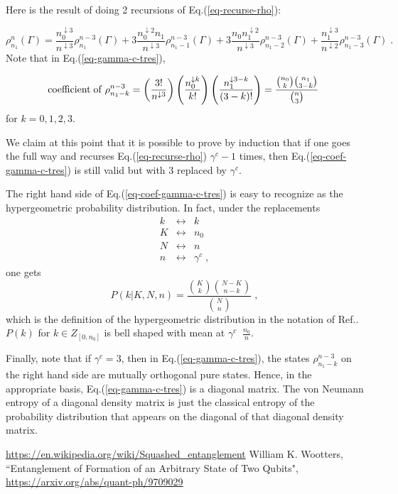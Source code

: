 \documentclass[12pt]{article}%
\newcommand{\beq}{\begin{equation}}
\newcommand{\eeq}{\end{equation}}
\newcommand{\beqa}{\begin{eqnarray}}
\newcommand{\eeqa}{\end{eqnarray}}
\newcommand{\darrow}[0]{{\downarrow}}
\begin{document}
{Here is the result of doing 2 recursions
of Eq.(\ref{eq-recurse-rho}):

\beq
\rho^{n}_{n_1}(\Gamma)=
\frac{n_0^{\darrow 3}}{n^{\darrow 3}}
\rho^{n-3}_{n_1}(\Gamma)
+
3\frac{n_0^{\darrow 2}n_1}{n^{\darrow 3}}
\rho^{n-3}_{n_1-1}(\Gamma)
+
3\frac{n_0 n_1^{\darrow 2}}{n^{\darrow 3}}
\rho^{n-3}_{n_1-2}(\Gamma)
+
\frac{n_1^{\darrow 3}}{n^{\darrow 2}}
\rho^{n-3}_{n_1-3}(\Gamma)
\;.
\label{eq-gamma-c-tres}
\eeq
Note that in Eq.(\ref{eq-gamma-c-tres}),

\beq
{\rm coefficient\;of\;}
\rho^{n-3}_{n_1-k} =
\left(\frac{3!}{n^{\darrow 3}}\right)
\left(\frac{n_0^{\darrow k}}{k!}\right)
\left(\frac{n_1^{\darrow 3-k}}{(3-k)!}\right)
=
\frac{{n_0\choose k}{n_1 \choose 3-k}}{{n\choose 3}}
\;
\label{eq-coef-gamma-c-tres}
\eeq
for $k=0,1,2,3$.

We claim at this point
that it is possible
to prove by induction
that if one goes the full way and recurses
Eq.(\ref{eq-recurse-rho}) $\gamma^c-1$
times, then
Eq.(\ref{eq-coef-gamma-c-tres})
is still valid but with
3 replaced by $\gamma^c$.

The right hand side of Eq.(\ref{eq-coef-gamma-c-tres})
is easy to recognize as the hypergeometric
probability distribution. In fact, under the
replacements
\beqa
k&\leftrightarrow&k
\\
K&\leftrightarrow&n_0
\\
N&\leftrightarrow&n
\\
n&\leftrightarrow&\gamma^c
\;,
\eeqa
one gets
\beq
P(k| K, N, n) =
\frac{{K\choose k}{N-K \choose n-k}}{{N\choose n}}
\;,
\eeq
which is the definition of the
hypergeometric distribution in
the notation of Ref.\cite{wiki-hypergeo}.
$P(k)$ for $k \in Z_{[0, n_0]}$
 is bell shaped with mean at $\gamma^c\;\;\frac{n_0}{n}$.

Finally, note that
if $\gamma^c=3$, then in Eq.(\ref{eq-gamma-c-tres}),
the states
$\rho^{n-3}_{n_1-k}$ on the right hand side are
mutually orthogonal pure states.
Hence, in the appropriate
basis,  Eq.(\ref{eq-gamma-c-tres})
is a diagonal matrix.
The von Neumann entropy of
a diagonal density matrix is
just
the classical entropy of
the probability distribution
that appears on the diagonal
of that diagonal density matrix.



\begin{thebibliography}{99}
\url{https://en.wikipedia.org/wiki/Squashed_entanglement}
William K. Wootters,
``Entanglement of Formation of an Arbitrary State of Two Qubits",
\url{https://arxiv.org/abs/quant-ph/9709029}


\end{thebibliography}}
\end{document}

